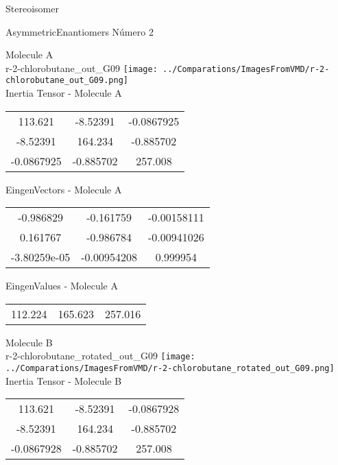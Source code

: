 \begin{center}
\vtab
\vtab
\textcolor{NavyBlue}{\Large Stereoisomer}
\end{center}

 \newpage

\vtab[-2cm]
\begin{center}
{\large AsymmetricEnantiomers \tab Número 2}
\end{center}
\begin{multicols}{2}
\begin{center}

Molecule A \\ 
r-2-chlorobutane\_out\_G09
\texttt{[image: ../Comparations/ImagesFromVMD/r-2-chlorobutane\_out\_G09.png]}
\\
Inertia Tensor - Molecule A \\
\vtab

\begin{tabular}{|c c c|}
113.621	 & 	-8.52391	 & 	-0.0867925	 \\
-8.52391	 & 	164.234	 & 	-0.885702	 \\
-0.0867925	 & 	-0.885702	 & 	257.008
\end{tabular}

\vtab
 EingenVectors - Molecule A     \\
\vtab
\begin{tabular}{|c c c|}
-0.986829	 & 	-0.161759	 & 	-0.00158111	 \\
0.161767	 & 	-0.986784	 & 	-0.00941026	 \\
-3.80259e-05	 & 	-0.00954208	 & 	0.999954
\end{tabular}

\vtab
 EingenValues - Molecule A     \\
\vtab
\begin{tabular}{|c c c|}
112.224	 & 	165.623	 & 	257.016	 \\
\end{tabular}
\columnbreak

Molecule B \\ 
r-2-chlorobutane\_rotated\_out\_G09
\texttt{[image: ../Comparations/ImagesFromVMD/r-2-chlorobutane\_rotated\_out\_G09.png]}
\\
Inertia Tensor - Molecule B \\
\vtab

\begin{tabular}{|c c c|}
113.621	 & 	-8.52391	 & 	-0.0867928	 \\
-8.52391	 & 	164.234	 & 	-0.885702	 \\
-0.0867928	 & 	-0.885702	 & 	257.008
\end{tabular}


\end{center}
\end{multicols}
